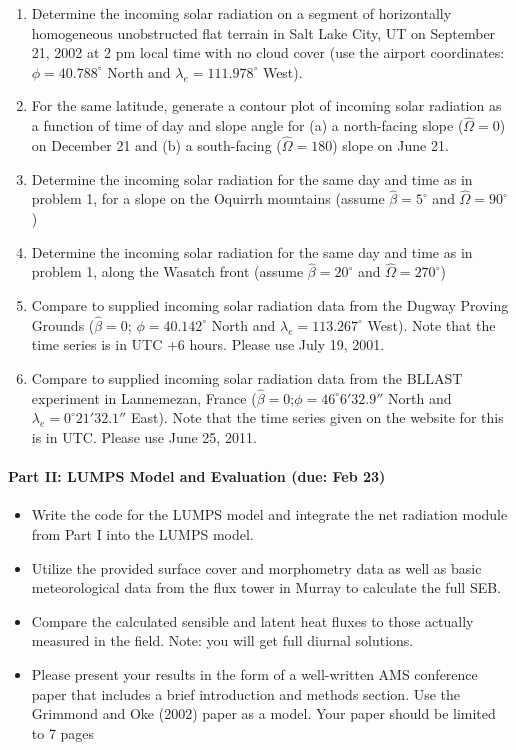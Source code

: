\documentclass[11pt]{article}
\begin{document}
\begin{enumerate}
	\item Determine the incoming solar radiation on a segment of horizontally homogeneous unobstructed flat terrain in Salt Lake City, UT on September 21, 2002 at 2 pm local time with no cloud cover (use the airport coordinates: $\phi=40.788^\circ$ North and $\lambda_e = 111.978^\circ$ West).
	\item For the same latitude, generate a contour plot of incoming solar radiation as a function of time of day and slope angle for (a) a north-facing slope ($\hat \Omega = 0$) on December 21 and (b) a south-facing ($\hat \Omega= 180$) slope on June 21.
	\item Determine the incoming solar radiation for the same day and time as in problem 1, for a slope on the Oquirrh mountains (assume $\hat \beta = 5^\circ$ and $\hat \Omega = 90^\circ$)
	\item Determine the incoming solar radiation for the same day and time as in problem 1, along the Wasatch front (assume $\hat \beta = 20^\circ$ and $\hat \Omega = 270^\circ$)
	\item Compare to supplied incoming solar radiation data from the Dugway Proving Grounds ($\hat \beta = 0$; $\phi = 40.142^\circ$ North and $\lambda_e = 113.267^\circ$ West). Note that the time series is in UTC +6 hours. Please use July 19, 2001.
	\item Compare to supplied incoming solar radiation data from the BLLAST experiment in Lannemezan, France ($\hat \beta = 0$;$\phi = 46^\circ 6' 32.9''$ North and $\lambda_e = 0^\circ 21' 32.1''$ East). Note that the time series given on the website for this is in UTC. Please use June 25, 2011.
\end{enumerate}

\paragraph{\large Part II: LUMPS Model and Evaluation (due: Feb 23)}
\begin{itemize}
\item Write the code for the LUMPS model and integrate the net radiation module from Part I into the LUMPS model.
\item Utilize the provided surface cover and morphometry data as well as basic meteorological data from the flux tower in Murray to calculate the full SEB.
\item Compare the calculated sensible and latent heat fluxes to those actually measured in the field. Note: you will get full diurnal solutions.
\item Please present your results in the form of a well-written AMS conference paper that includes a brief introduction and methods section. Use the Grimmond and Oke (2002) paper as a model. Your paper should be limited to 7 pages
\end{itemize}
\end{document}
